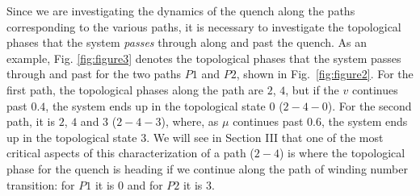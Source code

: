 \documentclass[aps,pra,reprint,superscriptaddress,longbibliography]{revtex4-2}
\begin{document}
Since we are investigating the dynamics of the quench along the paths corresponding to the various paths, it is necessary to investigate the topological phases that the system {\it passes} through along and past the quench. As an example, Fig. \ref{fig:figure3} denotes the topological phases that the system passes through and past for the two paths $P1$ and $P2$, shown in Fig.~\ref{fig:figure2}. For the first path, the topological phases along the path are $2$, $4$, but if the $v$ continues past $0.4$, the system ends up in the topological state $0$ ($2-4-0$). For the second path, it is $2$, $4$ and $3$ ($2-4-3$), where, as $\mu$ continues past $0.6$, the system ends up in the topological state $3$. We will see in Section III that one of the most critical aspects of this characterization of a path ($ 2-4 $) is where the topological phase for the quench is heading if we continue along the path of winding number transition: for $ P1 $ it is $ 0 $ and for $ P2 $ it is $ 3 $.%




	
\end{document}
